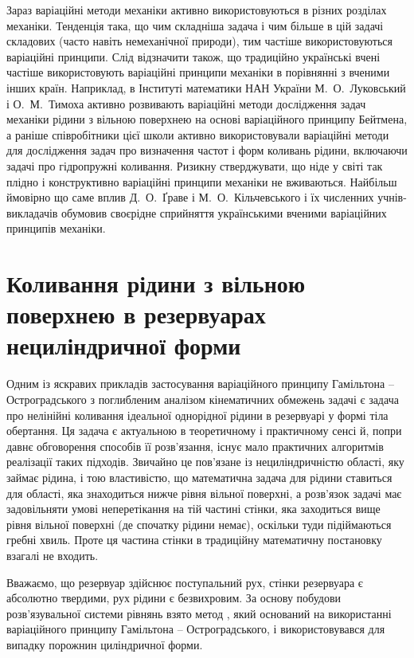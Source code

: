 \documentclass[11pt, reqno]{amsart}
\begin{document}
Зараз варіаційні методи механіки активно використовуються в різних розділах механіки. Тенденція така, що чим складніша задача і чим більше в цій задачі складових (часто навіть
немеханічної природи), тим частіше використовуються варіаційні принципи. Слід відзначити також, що традиційно українські вчені частіше використовують варіаційні принципи механіки в порівнянні з вченими інших країн. Наприклад, в Інституті математики НАН України М.~О.~Луковський і О.~М.~Тимоха активно розвивають варіаційні методи дослідження задач механіки рідини з вільною поверхнею на основі варіаційного принципу Бейтмена, а раніше співробітники цієї школи активно використовували варіаційні методи для дослідження задач про визначення частот і форм коливань рідини, включаючи задачі про гідропружні коливання. Ризикну стверджувати, що ніде у світі так плідно і конструктивно варіаційні принципи механіки не вживаються. Найбільш ймовірно що саме вплив Д.~О.~Ґраве і М.~О.~Кільчевського і їх численних учнів-викладачів обумовив своєрідне сприйняття українськими вченими варіаційних принципів механіки.


\section{Коливання рідини з вільною поверхнею в резервуарах нециліндричної форми}
Одним із яскравих прикладів застосування варіаційного принципу Гамільтона -- Остроградського з поглибленим аналізом кінематичних обмежень задачі є задача про нелінійні коливання ідеальної однорідної рідини в резервуарі у формі тіла обертання. Ця задача є актуальною в теоретичному і практичному сенсі й, попри давнє обговорення способів її розв'язання, існує мало практичних алгоритмів реалізації таких підходів. Звичайно це пов'язане із нециліндричністю області, яку займає рідина, і тою властивістю, що математична задача для рідини ставиться для області, яка знаходиться нижче рівня вільної поверхні, а розв'язок задачі має задовільняти умові неперетікання на тій частині стінки, яка заходиться вище рівня вільної поверхні (де спочатку рідини немає), оскільки туди підіймаються гребні хвиль. Проте ця частина стінки в традиційну математичну постановку взагалі не входить.

Вважаємо, що резервуар здійснює поступальний рух, стінки резервуара є абсолютно твердими, рух рідини є безвихровим. За основу побудови розв'язувальної системи рівнянь взято метод \cite{Limbo}, який оснований на використанні варіаційного принципу Гамільтона -- Остроградського, і використовувався для випадку порожнин циліндричної форми.
\end{document}
